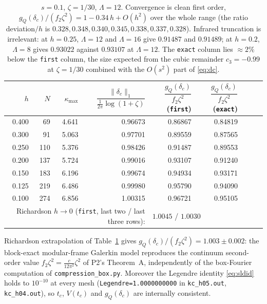 \documentclass[11pt]{article}
\begin{document}
\begin{table}[h]\centering\small
\begin{tabular}{rrrrrrrrr}
\toprule
$h$&$N$&$\kappa_{\max}$&$\dfrac{\|\delta_c\|_1}{\frac1{2\pi}\log(1+\zeta)}$&
$\dfrac{g_Q(\delta_c)}{f_2\zeta^2}$ (\texttt{first})&$\dfrac{g_Q(\delta_c)}{f_2\zeta^2}$ (\texttt{exact})\\
\midrule
0.400&  69&4.641&0.96673&0.86867&0.84819\\
0.300&  91&5.063&0.97701&0.89559&0.87565\\
0.250& 110&5.376&0.98426&0.91487&0.89553\\
0.200& 137&5.724&0.99016&0.93107&0.91240\\
0.150& 183&6.196&0.99674&0.94934&0.93171\\
0.125& 219&6.486&0.99980&0.95790&0.94090\\
0.100& 274&6.856&1.00315&0.96721&0.95105\\
\midrule
\multicolumn{4}{r}{Richardson $h\to0$ (\texttt{first}, last two / last three rows):}&
\multicolumn{2}{l}{$1.0045$ \quad / \quad $1.0030$}\\
\bottomrule
\end{tabular}
\caption{$s=0.1$, $\zeta=1/30$, $\Lambda=12$.  Convergence is clean first order,
$g_Q(\delta_c)/(f_2\zeta^2)=1-0.34\,h+O(h^2)$ over the whole range (the ratio
deviation$/h$ is $0.328,0.348,0.340,0.345,0.338,0.337,0.328$).  Infrared truncation is
irrelevant: at $h=0.25$, $\Lambda=12$ and $\Lambda=16$ give $0.91487$ and $0.91489$; at $h=0.2$,
$\Lambda=8$ gives $0.93022$ against $0.93107$ at $\Lambda=12$.  The \texttt{exact} column lies
$\approx2\%$ below the \texttt{first} column, the size expected from the cubic remainder
$c_3=-0.99$ at $\zeta=1/30$ combined with the $O(s^2)$ part of \eqref{eq:dc}.}
\label{tab:conv}
\end{table}

\begin{verdictok}
Richardson extrapolation of Table~\ref{tab:conv} gives
$g_Q(\delta_c)/(f_2\zeta^2)=1.003\pm0.002$: the block-exact modular-frame Galerkin model
reproduces the continuum second-order value $f_2\zeta^2=\frac{c}{12\pi^2}\zeta^2$ of P2's
Theorem~A, independently of the box-Fourier computation of \texttt{compression\_box.py}.
Moreover the Legendre identity \eqref{eq:sldid} holds to $10^{-10}$ at every mesh
(\texttt{Legendre=1.0000000000} in \texttt{kc\_h05.out}, \texttt{kc\_h04.out}), so $t_c$, $V(t_c)$
and $g_Q(\delta_c)$ are internally consistent.
\end{verdictok}
\end{document}
